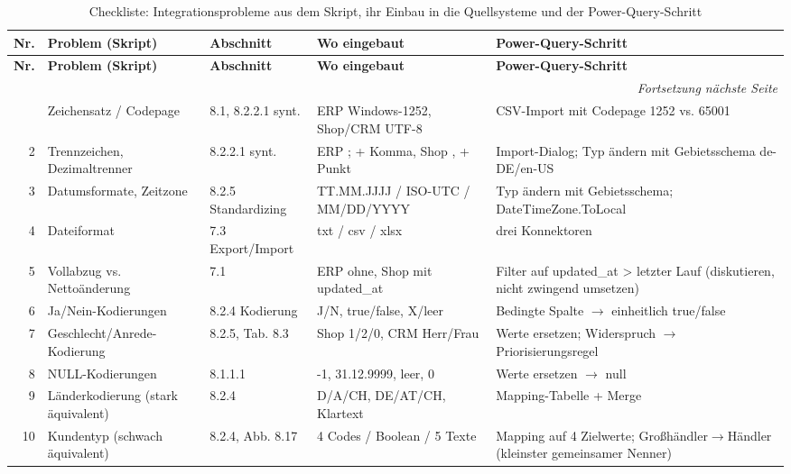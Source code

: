 \begin{landscape}
\begin{small}
\begin{longtable}{@{}r p{3.4cm} p{2.6cm} p{5.2cm} p{7.4cm}@{}}
\caption{Checkliste: Integrationsprobleme aus dem Skript, ihr Einbau in die Quellsysteme und der Power-Query-Schritt}\label{tab:checkliste}\\
\toprule
\textbf{Nr.} & \textbf{Problem (Skript)} & \textbf{Abschnitt} & \textbf{Wo eingebaut} & \textbf{Power-Query-Schritt}\\
\midrule\endfirsthead
\toprule
\textbf{Nr.} & \textbf{Problem (Skript)} & \textbf{Abschnitt} & \textbf{Wo eingebaut} & \textbf{Power-Query-Schritt}\\
\midrule\endhead
\midrule\multicolumn{5}{r}{\itshape Fortsetzung nächste Seite}\\\endfoot
\bottomrule\endlastfoot
1 & Zeichensatz / Codepage & 8.1, 8.2.2.1 synt. & ERP Windows-1252, Shop/CRM UTF-8 & CSV-Import mit Codepage 1252 vs. 65001\\[2pt]
2 & Trennzeichen, Dezimaltrenner & 8.2.2.1 synt. & ERP ; + Komma, Shop , + Punkt & Import-Dialog; Typ ändern mit Gebietsschema de-DE/en-US\\[2pt]
3 & Datumsformate, Zeitzone & 8.2.5 Standardizing & TT.MM.JJJJ / ISO-UTC / MM/DD/YYYY & Typ ändern mit Gebietsschema; DateTimeZone.ToLocal\\[2pt]
4 & Dateiformat & 7.3 Export/Import & txt / csv / xlsx & drei Konnektoren\\[2pt]
5 & Vollabzug vs. Nettoänderung & 7.1 & ERP ohne, Shop mit updated\_at & Filter auf updated\_at \textgreater{} letzter Lauf (diskutieren, nicht zwingend umsetzen)\\[2pt]
6 & Ja/Nein-Kodierungen & 8.2.4 Kodierung & J/N, true/false, X/leer & Bedingte Spalte $\rightarrow$ einheitlich true/false\\[2pt]
7 & Geschlecht/Anrede-Kodierung & 8.2.5, Tab. 8.3 & Shop 1/2/0, CRM Herr/Frau & Werte ersetzen; Widerspruch $\rightarrow$ Priorisierungsregel\\[2pt]
8 & NULL-Kodierungen & 8.1.1.1 & -1, 31.12.9999, leer, 0 & Werte ersetzen $\rightarrow$ null\\[2pt]
9 & Länderkodierung (stark äquivalent) & 8.2.4 & D/A/CH, DE/AT/CH, Klartext & Mapping-Tabelle + Merge\\[2pt]
10 & Kundentyp (schwach äquivalent) & 8.2.4, Abb. 8.17 & 4 Codes / Boolean / 5 Texte & Mapping auf 4 Zielwerte; Großhändler$\rightarrow$Händler (kleinster gemeinsamer Nenner)\\[2pt]

\end{longtable}
\end{small}
\end{landscape}
